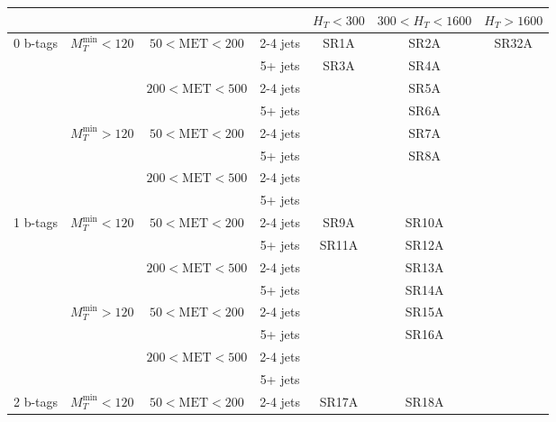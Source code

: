\documentclass[plain,landscape]{article}
\begin{document}
\begin{table}
\renewcommand{\arraystretch}{1.3}
\centering
\begin{tabular}{|c|c|c|c|c|c|c|}
\hline
& & \multicolumn{2}{|c|}{ } & $H_T < 300$ & $300 < H_T < 1600$ & $H_T > 1600$  \\
\hline
\multirow{8}{*}{0 b-tags} &  \multirow{4}{*}{$M_T^{\textrm{min}} < 120$} & \multirow{2}{*}{ $50 < \textrm{MET} < 200$} & 2-4 jets & SR1A & SR2A & \multirow{30}{*}{SR32A}\\
\cline{4-6}
& & & 5+ jets & \multirow{7}{*}{SR3A} & SR4A & \\
\cline{3-4} \cline{6-6}
& &  \multirow{2}{*}{$200 < \textrm{MET} < 500$} &  2-4 jets & &  SR5A & \\
\cline{4-4} \cline{6-6}
& & & 5+ jets & & SR6A &  \\
\cline{2-4} \cline{6-6}
& \multirow{4}{*}{$M_T^{\textrm{min}} > 120$} & \multirow{2}{*}{ $50 < \textrm{MET} < 200$} & 2-4 jets & & SR7A & \\
\cline{4-4} \cline{6-6}
& & & 5+ jets & & \multirow{3}{*}{SR8A} & \\
\cline{3-4}
& &  \multirow{2}{*}{$200 < \textrm{MET} < 500$} &  2-4 jets & & &  \\
\cline{4-4} 
& & & 5+ jets & & &  \\
\cline{1-6}
\multirow{8}{*}{1 b-tags} & \multirow{4}{*}{$M_T^{\textrm{min}} < 120$} & \multirow{2}{*}{ $50 < \textrm{MET} < 200$} & 2-4 jets & SR9A & SR10A & \\
\cline{4-6}
& & & 5+ jets & \multirow{7}{*}{SR11A} & SR12A & \\
\cline{3-4} \cline{6-6}
& & \multirow{2}{*}{ $200 < \textrm{MET} < 500$} &  2-4 jets & &  SR13A & \\
\cline{4-4} \cline{6-6}
& & & 5+ jets & & SR14A & \\
\cline{2-4} \cline{6-6}
 & \multirow{4}{*}{$M_T^{\textrm{min}} > 120$} & \multirow{2}{*}{ $50 < \textrm{MET} < 200$} & 2-4 jets & & SR15A & \\
\cline{4-4} \cline{6-6}
& & & 5+ jets &  & \multirow{3}{*}{SR16A} & \\
\cline{3-4}
& & \multirow{2}{*}{ $200 < \textrm{MET} < 500$} &  2-4 jets & & & \\
\cline{4-4}
& & & 5+ jets & & & \\
\cline{1-6}
\multirow{8}{*}{2 b-tags} & \multirow{4}{*}{$M_T^{\textrm{min}} < 120$} & \multirow{2}{*}{ $50 < \textrm{MET} < 200$} & 2-4 jets & SR17A & SR18A & \\

\end{tabular}
\end{table}
\end{document}
